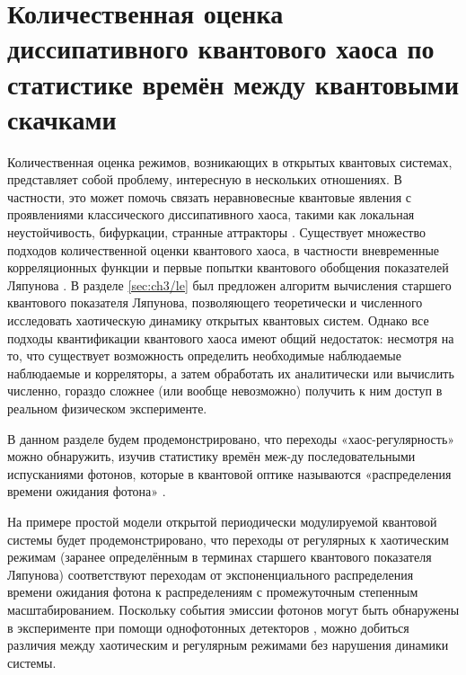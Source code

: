\section{Количественная оценка диссипативного квантового хаоса по статистике времён между квантовыми скачками}\label{sec:ch3/pwtd}

Количественная оценка режимов, возникающих в открытых квантовых системах, представляет собой проблему, интересную в нескольких отношениях. 
В частности, это может помочь связать неравновесные квантовые явления с проявлениями классического диссипативного хаоса, такими как локальная неустойчивость, бифуркации, странные аттракторы \cite{Ott2002}.
Существует множество подходов количественной оценки квантового хаоса, в частности вневременные корреляционных функции \cite{Rozenbaum2017, Liao2018, ChavezCarlos2019} и первые попытки квантового обобщения показателей Ляпунова \cite{Toda1987, Haake1992, Manko2000}. 
В разделе \cref{sec:ch3/le} был предложен алгоритм вычисления старшего квантового показателя Ляпунова, позволяющего теоретически и численного исследовать хаотическую динамику открытых квантовых систем.
Однако все подходы квантификации квантового хаоса имеют общий недостаток: несмотря на то, что существует возможность  определить необходимые наблюдаемые наблюдаемые и корреляторы, а затем обработать их аналитически или вычислить численно, гораздо сложнее (или вообще невозможно) получить к ним доступ в реальном физическом эксперименте. 

В данном разделе будем продемонстрировано, что переходы «хаос-регулярность» можно обнаружить, изучив статистику времён меж-ду последовательными испусканиями фотонов, которые в квантовой оптике называются «распределения времени ожидания фотона» \cite{Carmichael1993, Brange2019}.

На примере простой модели открытой периодически модулируемой квантовой системы будет продемонстрировано, что переходы от регулярных к хаотическим режимам (заранее определённым в терминах старшего квантового показателя Ляпунова) соответствуют переходам от экспоненциального распределения времени ожидания фотона к распределениям с промежуточным степенным масштабированием. Поскольку события эмиссии фотонов могут быть обнаружены в эксперименте при помощи однофотонных детекторов \cite{Delteil2014, Cohen2015}, можно добиться различия между хаотическим и регулярным режимами без нарушения динамики системы.

